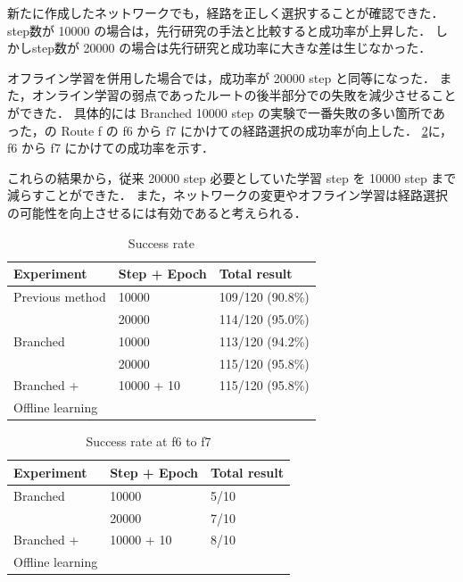 新たに作成したネットワークでも，経路を正しく選択することが確認できた．
step数が 10000 の場合は，先行研究の手法と比較すると成功率が上昇した．
しかしstep数が 20000 の場合は先行研究と成功率に大きな差は生じなかった．

オフライン学習を併用した場合では，成功率が 20000 step と同等になった．
また，オンライン学習の弱点であったルートの後半部分での失敗を減少させることができた．
具体的には Branched 10000 step の実験で一番失敗の多い箇所であった，の Route f の f6 から f7 にかけての経路選択の成功率が向上した．
\ref{tab:f_result}に，f6 から f7 にかけての成功率を示す．

これらの結果から，従来 20000 step 必要としていた学習 step を 10000 step まで減らすことができた．
また，ネットワークの変更やオフライン学習は経路選択の可能性を向上させるには有効であると考えられる．

\begin{table}[]
  \centering
  \caption{Success rate}
  \begin{tabular}{lll}
  \hline
  Experiment         & Step + Epoch & Total result     \\ \hline
  Previous method    & 10000        & 109/120 (90.8\%) \\
                     & 20000        & 114/120 (95.0\%) \\ \hline
  Branched           & 10000        & 113/120 (94.2\%) \\ 
                     & 20000        & 115/120 (95.8\%) \\ \hline
  Branched +         & 10000 + 10   & 115/120 (95.8\%) \\ 
  Offline learning   &              &                  \\ \hline
  \end{tabular}
  \label{tab:result}
\end{table}

\begin{table}[]
  \centering
  \caption{Success rate at f6 to f7}
  \begin{tabular}{lll}
  \hline
  Experiment         & Step + Epoch & Total result \\ \hline
  Branched           & 10000        & 5/10         \\ 
                     & 20000        & 7/10         \\ \hline
  Branched +         & 10000 + 10   & 8/10         \\ 
  Offline learning   &              &              \\ \hline
  \end{tabular}
  \label{tab:f_result}
\end{table}
